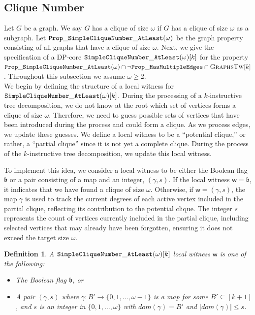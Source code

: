 \documentclass[11pt,a4paper]{article}
\newtheorem{definition}[theorem]{Definition}
\newcommand{\treewidthvalue}{k}
\newcommand{\agraph}{G}
\newcommand{\bagset}{B}
\newcommand{\awitness}{\mathsf{w}}
\newcommand{\dpcore}{\mathsf{D}}
\newcommand{\allgraphstreewidth}[1]{\textsc{GraphsTw}[#1]}
\newcommand{\dpNamePart}[1]{\mbox{\normalfont\ttfamily #1}}
\newcommand{\hasMultiEdgeProperty}{\dpNamePart{Prop}\_\allowbreak\dpNamePart{HasMultipleEdges}}
\newcommand{\simpleCliqueNumberAtLeastProperty}[1]{\dpNamePart{Prop}\_\allowbreak\dpNamePart{SimpleCliqueNumber}\_\allowbreak\dpNamePart{AtLeast}(#1)}
\newcommand{\simpleCliqueNumberAtLeastCore}[1]{\dpNamePart{SimpleCliqueNumber}\_\allowbreak\dpNamePart{AtLeast}(#1)}
\newcommand{\domain}{dom}
\newcommand{\cliqueparameter}{\omega}
\newcommand{\cliquemap}{\gamma}
\newcommand{\cliquesize}{s}
\newcommand{\cliquefound}{\mathfrak{b}}
\begin{document}
\subsection{Clique Number}

	{
			\renewcommand{\dpcore}{\simpleCliqueNumberAtLeastCore{\cliqueparameter}}
			Let $\agraph$ be a graph. We say $\agraph$ has a clique of size $\cliqueparameter$ if $\agraph$ has a clique of size $\cliqueparameter$ as a subgraph. Let $\simpleCliqueNumberAtLeastProperty{\cliqueparameter}$ be the graph property consisting of all graphs that have a clique of size $\cliqueparameter$. Next, we give the specification of a DP-core $\dpcore[\treewidthvalue]$ for the property $\simpleCliqueNumberAtLeastProperty{\cliqueparameter} \cap \neg \hasMultiEdgeProperty \cap \allgraphstreewidth{\treewidthvalue}$.
		Throughout this subsection we assume $\cliqueparameter\ge 2$.
		\\

	 We begin by defining the structure of a local witness for $\dpcore[\treewidthvalue]$. During the processing of a $\treewidthvalue$-instructive tree decomposition, we do not know at the root which set of vertices forms a clique of size $\cliqueparameter$. Therefore, we need to guess possible sets of vertices that have been introduced during the process and could form a clique. As we process edges, we update these guesses. We define a local witness to be a “potential clique,” or rather, a “partial clique” since it is not yet a complete clique. During the process of the $\treewidthvalue$-instructive tree decomposition, we update this local witness.

		To implement this idea, we consider a local witness to be either the Boolean flag $\cliquefound$ or a pair consisting of a map and an integer, $(\cliquemap, \cliquesize)$. If the local witness $\awitness = \cliquefound$, it indicates that we have found a clique of size $\cliqueparameter$. Otherwise, if $\awitness = (\cliquemap,\cliquesize)$, the map $\cliquemap$ is used to track the current degrees of each active vertex included in the partial clique, reflecting its contribution to the potential clique. The integer $\cliquesize$ represents the count of vertices currently included in the partial clique, including selected vertices that may already have been forgotten, ensuring it does not exceed the target size $\cliqueparameter$.

	\begin{definition}\label{definition:clique-witness}
	A $\dpcore[\treewidthvalue]$ local witness $\awitness$ is one of the following:
	\begin{itemize}
		\item The Boolean flag $\cliquefound$, or
				\item A pair $(\cliquemap,\cliquesize)$ where $\cliquemap:\bagset' \to \{0,1,\dots,\cliqueparameter-1\}$ is a map for some $\bagset'\subseteq [\treewidthvalue+1]$, and $\cliquesize$ is an integer in $\{0,1,\dots,\cliqueparameter\}$ with $\domain(\cliquemap)=\bagset'$ and $|\domain(\cliquemap)|\le \cliquesize$.
	\end{itemize}
	\end{definition}

}
\end{document}
